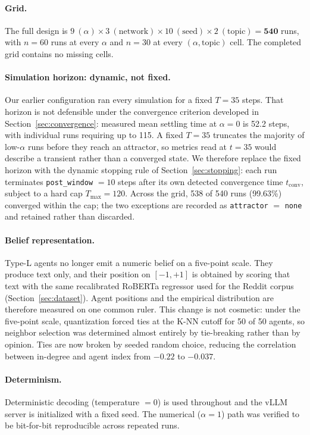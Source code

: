 \paragraph{Grid.}
The full design is
$9\ (\alpha) \times 3\ (\text{network}) \times 10\ (\text{seed}) \times 2\ (\text{topic})
= \mathbf{540}$ runs, with $n = 60$ runs at every $\alpha$ and $n = 30$ at every
$(\alpha, \text{topic})$ cell. The completed grid contains no missing cells.

\paragraph{Simulation horizon: dynamic, not fixed.}
Our earlier configuration ran every simulation for a fixed $T = 35$ steps. That horizon
is not defensible under the convergence criterion developed in
Section~\ref{sec:convergence}: measured mean settling time at $\alpha = 0$ is 52.2 steps,
with individual runs requiring up to 115. A fixed $T = 35$ truncates the majority of
low-$\alpha$ runs before they reach an attractor, so metrics read at $t = 35$ would
describe a transient rather than a converged state. We therefore replace the fixed
horizon with the dynamic stopping rule of Section~\ref{sec:stopping}: each run terminates
\texttt{post\_window} $= 10$ steps after its own detected convergence time
$t_{\mathrm{conv}}$, subject to a hard cap $T_{\max} = 120$. Across the grid, 538 of 540
runs (99.63\%) converged within the cap; the two exceptions are recorded as
\texttt{attractor} $=$ \texttt{none} and retained rather than discarded.

\paragraph{Belief representation.}
Type-L agents no longer emit a numeric belief on a five-point scale. They produce text
only, and their position on $[-1,+1]$ is obtained by scoring that text with the same
recalibrated RoBERTa regressor used for the Reddit corpus (Section~\ref{sec:dataset}).
Agent positions and the empirical distribution are therefore measured on one common
ruler. This change is not cosmetic: under the five-point scale, quantization forced ties
at the K-NN cutoff for 50 of 50 agents, so neighbor selection was determined almost
entirely by tie-breaking rather than by opinion. Ties are now broken by seeded random
choice, reducing the correlation between in-degree and agent index from $-0.22$ to
$-0.037$.

\paragraph{Determinism.}
Deterministic decoding (temperature $= 0$) is used throughout and the vLLM server is
initialized with a fixed seed. The numerical ($\alpha = 1$) path was verified to be
bit-for-bit reproducible across repeated runs.

